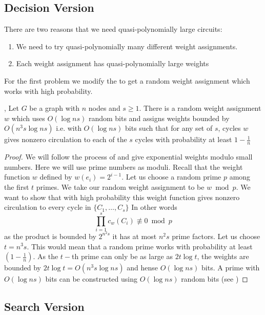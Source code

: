 \subsection{Decision Version}
There are two reasons that we need quasi-polynomially large circuits:\begin{enumerate}[label=(\roman*)]
\item We need to try quasi-polynomially many different weight assignments. 
\item Each weight assignment has quasi-polynomially large weights
\end{enumerate}
For the first problem we modify the  to get a random weight assignment which works with high probability.

\begin{lemma}{\cite{ChariRohatgiSrinivasan_1993_Rou_CONF},\cite{KlivansSpielman_2001_Rei_CONF}}{}
	Let $G$ be a graph with $n$ nodes and $s\geq 1$. There is a random weight assignment $w$ which uses $O(\log ns)$ random bits and assigns weights bounded by $O(n^3s\log ns)$ i.e. with $O(\log ns)$ bits such that for any set of $s$, cycles $w$ gives nonzero circulation to each of the $s$ cycles with probability at least $1-\frac{1}{n}$
\end{lemma}
\begin{proof}
	We will follow the process of  and give exponential weights modulo small numbers. Here we will use prime numbers as moduli. Recall that the weight function $w$ defined by $w(e_i)=2^{i-1}$. Let us choose a random prime $p$ among the first $t$ primes. We take our random weight assignment to be $w\bmod p$. We want to show that with high probability this weight function gives nonzero circulation to every cycle in $\{C_1,\dots, C_s\}$ In other words \[
		 \prod\limits_{i=1}^{s} c_w(C_i)\not\equiv 0\bmod p			 
	\]
	as the product is bounded by $2^{n^2s}$ it has at most $n^2s$ prime factors. Let us choose $t=n^3s$. This would mean that a random prime works with probability at least $\left(1-\frac1n\right)$. As the $t-$th prime can only be as large as $2t\log t$, the weights are bounded by $2t\log t=O(n^3s\log ns)$ and hense $O(\log ns)$ bits. A prime with $O(\log ns)$ bits can be constructed using $O(\log ns)$ random bits (see \cite{KlivansSpielman_2001_Rei_CONF})
\end{proof}

\subsection{Search Version}